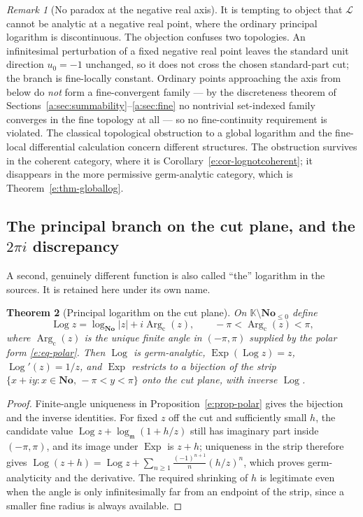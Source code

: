 \documentclass[11pt,a4paper]{article}
\numberwithin{equation}{section}
\newtheorem{theorem}{Theorem}[section]
\theoremstyle{definition}
\theoremstyle{remark}
\newtheorem{remark}[theorem]{Remark}
\theoremstyle{plain}
\newcommand{\K}{\mathbb K}
\newcommand{\No}{\mathbf{No}}
\newcommand{\mm}{\mathfrak m}
\DeclareMathOperator{\Arg}{Arg}
\DeclareMathOperator{\Log}{Log}
\DeclareMathOperator{\Exp}{Exp}
\newcommand{\abs}[1]{\lvert #1\rvert}
\begin{document}
\begin{remark}[No paradox at the negative real axis]\label{e:rem-noparadox}
It is tempting to object that $\mathcal L$ cannot be analytic at a
negative real point, where the ordinary principal logarithm is
discontinuous.  The objection confuses two topologies.  An infinitesimal
perturbation of a fixed negative real point leaves the standard unit
direction $u_0=-1$ unchanged, so it does not cross the chosen
standard-part cut; the branch is fine-locally constant.  Ordinary points
approaching the axis from below do \emph{not} form a fine-convergent
family --- by the discreteness theorem of Sections~\ref{a:sec:summability}--\ref{a:sec:fine} no nontrivial set-indexed
family converges in the fine topology at all --- so no fine-continuity
requirement is violated.  The classical topological obstruction to a
global logarithm and the fine-local differential calculation concern
different structures.  The obstruction survives in the coherent category,
where it is Corollary~\ref{e:cor-lognotcoherent}; it disappears in the more
permissive germ-analytic category, which is Theorem~\ref{e:thm-globallog}.
\end{remark}

\subsection{The principal branch on the cut plane, and the
\texorpdfstring{$2\pi i$}{2 pi i} discrepancy}\label{e:sec-principallog}

A second, genuinely different function is also called ``the'' logarithm in
the sources.  It is retained here under its own name.

\begin{theorem}[Principal logarithm on the cut plane]\label{e:thm-principallog}
On $\K\setminus\No_{\le0}$ define
\[
 \Log z=\log_{\No}\abs z+i\Arg_{\mathrm c}(z),
 \qquad -\pi<\Arg_{\mathrm c}(z)<\pi,
\]
where $\Arg_{\mathrm c}(z)$ is the unique finite angle in $(-\pi,\pi)$
supplied by the polar form \eqref{e:eq-polar}.  Then $\Log$ is
germ-analytic, $\Exp(\Log z)=z$, $\Log'(z)=1/z$, and $\Exp$ restricts to a
bijection of the strip $\{x+iy:x\in\No,\,-\pi<y<\pi\}$ onto the cut plane,
with inverse $\Log$.
\end{theorem}

\begin{proof}
Finite-angle uniqueness in Proposition~\ref{e:prop-polar} gives the
bijection and the inverse identities.  For fixed $z$ off the cut and
sufficiently small $h$, the candidate value
$\Log z+\log_{\mm}(1+h/z)$ still has imaginary part inside $(-\pi,\pi)$,
and its image under $\Exp$ is $z+h$; uniqueness in the strip therefore
gives
$\Log(z+h)=\Log z+\sum_{n\ge1}\frac{(-1)^{n+1}}{n}(h/z)^n$, which proves
germ-analyticity and the derivative.  The required shrinking of $h$ is
legitimate even when the angle is only infinitesimally far from an
endpoint of the strip, since a smaller fine radius is always available.
\end{proof}
\end{document}
